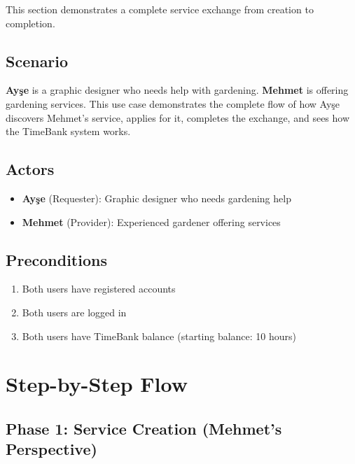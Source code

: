 \documentclass[12pt,a4paper]{report}
\begin{document}
This section demonstrates a complete service exchange from creation to completion.

\subsection{Scenario}

\textbf{Ayşe} is a graphic designer who needs help with gardening. \textbf{Mehmet} is offering gardening services. This use case demonstrates the complete flow of how Ayşe discovers Mehmet's service, applies for it, completes the exchange, and sees how the TimeBank system works.

\subsection{Actors}

\begin{itemize}
    \item \textbf{Ayşe} (Requester): Graphic designer who needs gardening help
    \item \textbf{Mehmet} (Provider): Experienced gardener offering services
\end{itemize}

\subsection{Preconditions}

\begin{enumerate}
    \item Both users have registered accounts
    \item Both users are logged in
    \item Both users have TimeBank balance (starting balance: 10 hours)
\end{enumerate}

\section{Step-by-Step Flow}

\subsection{Phase 1: Service Creation (Mehmet's Perspective)}
\end{document}

